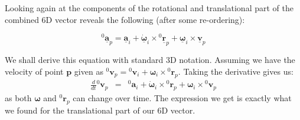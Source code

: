 \documentclass[a4paper]{article}
\newcommand{\Nspa}[1]{\mathbf{\underline{#1}}}
\newcommand{\Vec}[1]{\mathbf{#1}}
\begin{document}
Looking again at the components of the rotational and translational part of
the combined 6D vector reveals the following (after some re-ordering):

\begin{equation}
	{}^0\Nspa{a}_p = \Nspa{a}_i +
	\Nspa{\dot{\omega}}_i
	\times
	{}^0\Nspa{r}_p
	+
	\Nspa{\omega}_i \times \Nspa{v}_p
	\label{}
\end{equation}

We shall derive this equation with standard 3D notation. Assuming we have the
velocity of point $\Vec{p}$ given as ${}^0\Vec{v}_p = {}^0\Vec{v}_i + \Vec{\omega}_i
\times {}^0\Vec{r}_p$. Taking the derivative gives us:
\begin{eqnarray}
	\frac{d}{dt} {}^0 \Vec{v}_p & = & {}^0 \Vec{a}_i + \Vec{\dot{\omega}}_i \times
	{}^0 \Vec{r}_p + \Vec{\omega}_i \times {}^0 \Vec{ v}_p
	\label{}
\end{eqnarray}
as both $\Vec{\omega}$ and ${}^0\Vec{r}_p$ can change over time. The
expression we get is exactly what we found for the translational part of our 6D vector.
\end{document}
